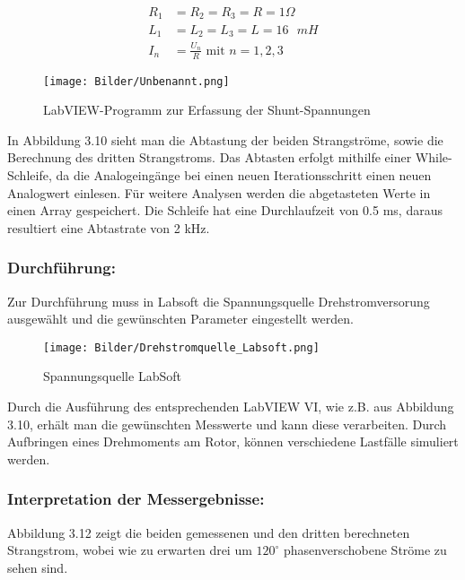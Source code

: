 \begin{align*}
R_1 &= R_2=R_3=R=1\Omega\\
L_1 &=L_2=L_3=L=16  \text{ }  \si{mH}\\
I_n	&=\frac{U_n}{R} \text{ mit } n =1,2,3
\end{align*}


\begin{figure}[H]
	\centering
	\texttt{[image: Bilder/Unbenannt.png]} %
	\caption{LabVIEW-Programm zur Erfassung der Shunt-Spannungen}
	\label{fig: Drehfeld}
\end{figure}


In Abbildung 3.10 sieht man die Abtastung der beiden Strangströme, sowie die Berechnung des dritten Strangstroms. Das Abtasten erfolgt mithilfe einer While-Schleife, da die Analogeingänge bei einen neuen Iterationsschritt einen neuen Analogwert einlesen. Für weitere Analysen werden die abgetasteten Werte in einen Array gespeichert. Die Schleife hat eine Durchlaufzeit von 0.5 ms, daraus resultiert eine Abtastrate von 2 k$\si{\hertz}$. \cite{shiftregister,while,measure}

\subsubsection{Durchführung:}

Zur Durchführung muss in Labsoft die Spannungsquelle  \glqq Drehstromversorung\grqq{} ausgewählt und die gewünschten Parameter eingestellt werden.

\begin{figure}[H]
	\centering
	\texttt{[image: Bilder/Drehstromquelle\_Labsoft.png]} %
	\caption{Spannungsquelle LabSoft}
	\label{fig: Spannungsquelle Labsoft}
\end{figure}


Durch die Ausführung des entsprechenden LabVIEW VI, wie z.B. aus Abbildung 3.10, erhält man die gewünschten Messwerte und kann diese verarbeiten. Durch Aufbringen eines Drehmoments am Rotor, können verschiedene Lastfälle simuliert werden.


\subsubsection{Interpretation der Messergebnisse:}


Abbildung 3.12 zeigt die beiden gemessenen und den dritten berechneten Strangstrom, wobei wie zu erwarten drei um \(120^\circ\) phasenverschobene Ströme zu sehen sind.


